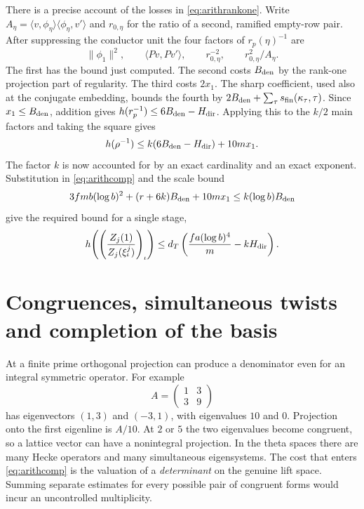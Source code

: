There is a precise account of the losses in \eqref{eq:arithrankone}. Write
$A_\eta=\langle v,\phi_\eta\rangle\langle\phi_\eta,v'\rangle$ and $r_{0,\eta}$ for the ratio of a second, ramified empty-row pair. After suppressing the conductor unit the four factors of $r_p(\eta)^{-1}$ are
\[
    \|\phi_1\|^2,\qquad
    \langle Pv,Pv'\rangle,\qquad
    r_{0,\eta}^{-2},\qquad r_{0,\eta}^{2}/A_\eta .
\]
The first has the bound just computed. The second costs $B_{\rm den}$ by the rank-one projection part of regularity. The third costs $2x_1$. The sharp coefficient, used also at the conjugate embedding, bounds the fourth by $2B_{\rm den}+\sum_\tau s_{\rm fin}(\kappa_\tau,\tau)$. Since $x_1\le B_{\rm den}$, addition gives $h(r_p^{-1})\le6B_{\rm den}-H_{\rm dir}$. Applying this to the $k/2$ main factors and taking the square gives
\[
 h(\rho^{-1})\le k(6B_{\rm den}-H_{\rm dir})+10m x_1 .
\]
The factor $k$ is now accounted for by an exact cardinality and an exact exponent. Substitution in \eqref{eq:arithcomp} and the scale bound
\[
 3fmb(\log b)^2+(r+6k)B_{\rm den}+10m x_1
      \le k(\log b)B_{\rm den}
\]
give the required bound for a single stage,
\begin{equation}
 h\!\left(\left(\frac{Z_j(1)}{Z_j(\xi_\iota^j)}\right)_\iota\right)
 \le d_T\left(\frac{fa(\log b)^4}{m}-kH_{\rm dir}\right).
 \label{eq:arithonestage}
\end{equation}

\section{Congruences, simultaneous twists and completion of the basis}
\label{sec:arithcong}
At a finite prime orthogonal projection can produce a denominator even for an integral symmetric operator. For example
\[
 A=\begin{pmatrix}1&3\\3&9\end{pmatrix}
\]
has eigenvectors $(1,3)$ and $(-3,1)$, with eigenvalues $10$ and $0$. Projection onto the first eigenline is $A/10$. At $2$ or $5$ the two eigenvalues become congruent, so a lattice vector can have a nonintegral projection. In the theta spaces there are many Hecke operators and many simultaneous eigensystems. The cost that enters \eqref{eq:arithcomp} is the valuation of a \emph{determinant} on the genuine lift space. Summing separate estimates for every possible pair of congruent forms would incur an uncontrolled multiplicity.

